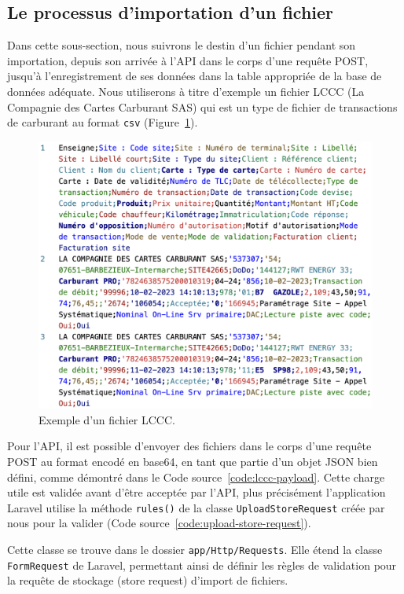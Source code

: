 \subsection{Le processus d'importation d'un fichier}

Dans cette sous-section, nous suivrons le destin d'un fichier pendant son importation, depuis son arrivée à l'API dans le corps d'une requête POST, jusqu'à l'enregistrement de ses données dans la table appropriée de la base de données adéquate. Nous utiliserons à titre d'exemple un fichier LCCC (La Compagnie des Cartes Carburant SAS) qui est un type de fichier de transactions de carburant au format \Verb|csv| (Figure~\ref{fig:lccc}).

\begin{figure}[ht]
    \centering
    \includegraphics[width=\textwidth]{img/lccc-csv}
    \caption{Exemple d'un fichier LCCC.}
    \label{fig:lccc}
\end{figure}

Pour l'API, il est possible d'envoyer des fichiers dans le corps d'une requête POST au format encodé en base64, en tant que partie d'un objet JSON bien défini, comme démontré dans le Code source~\ref{code:lccc-payload}. Cette charge utile est validée avant d'être acceptée par l'API, plus précisément l'application Laravel utilise la méthode \Verb|rules()| de la classe \Verb|UploadStoreRequest| créée par nous pour la valider (Code source~\ref{code:upload-store-request}).

Cette classe se trouve dans le dossier \Verb|app/Http/Requests|. Elle étend la classe \Verb|FormRequest| de Laravel, permettant ainsi de définir les règles de validation pour la requête de stockage (store request) d'import de fichiers.

